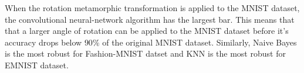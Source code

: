 \clearpage
When the rotation metamorphic transformation is applied to the MNIST dataset, the convolutional neural-network algorithm has the largest bar. This means that that a larger angle of rotation can be applied to the MNIST dataset before it's accuracy drops below $90\%$ of the original MNIST dataset. Similarly, Naive Bayes is the most robust for Fashion-MNIST datset and KNN is the most robust for EMNIST dataset.

\mnistx
    
\mnisty


